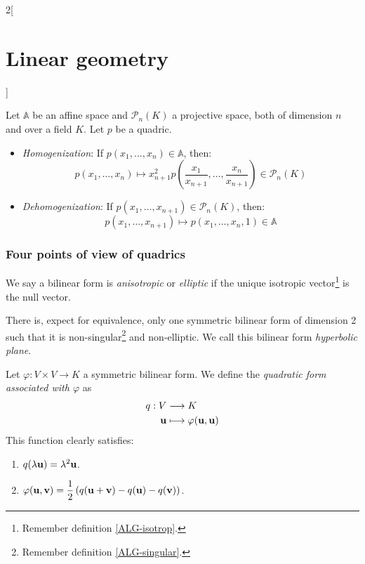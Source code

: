 \documentclass[../../../main.tex]{subfiles}
\begin{document}
\begin{multicols}{2}[\section{Linear geometry}]
  \begin{prop}
    Let $\mathbb{A}$ be an affine space and $\mathcal{P}_n(K)$ a projective space, both of dimension $n$ and over a field $K$. Let $p$ be a quadric.
    \begin{itemize}
      \item\textit{Homogenization}: If $p(x_1,\ldots,x_n)\in\mathbb{A}$, then: $$p(x_1,\ldots,x_n)\mapsto x_{n+1}^2p\left(\frac{x_1}{x_{n+1}},\ldots,\frac{x_n}{x_{n+1}}\right)\in\mathcal{P}_n(K)$$
      \item\textit{Dehomogenization}: If $p(x_1,\ldots,x_{n+1})\in\mathcal{P}_n(K)$, then: $$p(x_1,\ldots,x_{n+1})\mapsto p(x_1,\ldots,x_n,1)\in\mathbb{A}$$
    \end{itemize}
  \end{prop}
  \subsubsection{Four points of view of quadrics}
  \begin{definition}
    We say a bilinear form is \textit{anisotropic} or \textit{elliptic} if the unique isotropic vector\footnote{Remember definition \ref{ALG-isotrop}.} is the null vector.
  \end{definition}
  \begin{theorem}
    There is, expect for equivalence, only one symmetric bilinear form of dimension 2 such that it is non-singular\footnote{Remember definition \ref{ALG-singular}.} and non-elliptic. We call this bilinear form \textit{hyperbolic plane}.
  \end{theorem}
  \begin{definition}
    Let $\varphi:V\times V\rightarrow K$ a symmetric bilinear form. We define the \textit{quadratic form associated with $\varphi$} as
    \begin{align*}
      q:V                & \longrightarrow K                                         \\
      \boldsymbol{\mathrm{u}} & \longmapsto\varphi(\boldsymbol{\mathrm{u}},\boldsymbol{\mathrm{u}})
    \end{align*} This function clearly satisfies:
    \begin{enumerate}
      \item $q(\lambda\boldsymbol{\mathrm{u}})=\lambda^2\boldsymbol{\mathrm{u}}$.
      \item $\displaystyle\varphi(\boldsymbol{\mathrm{u}},\boldsymbol{\mathrm{v}})=\frac{1}{2}\left(q(\boldsymbol{\mathrm{u}}+\boldsymbol{\mathrm{v}})-q(\boldsymbol{\mathrm{u}})-q(\boldsymbol{\mathrm{v}})\right)$.

\end{enumerate}
\end{definition}
\end{multicols}
\end{document}
